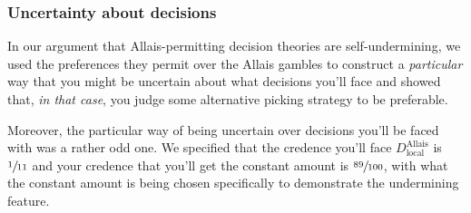 \documentclass[a4paper]{article}
\newcommand{\todoold}[2][]{\todo[backgroundcolor=white,bordercolor=orange!10,linecolor=gray!10, #1,caption={},textcolor=gray]{Pre-rev: #2}}
\newcommand{\todooldinfo}[2][]{\todoold[#1]{#2}}
\renewcommand{\color}[1]{}
\newenvironment{CCM rewritten}
{\begingroup\color{blue}} %
{\endgroup}              %
\begin{document}
%
%


\subsubsection{Uncertainty about decisions}\label{sect:reu:other mu}

In our argument that Allais-permitting decision theories are self-undermining, we used the preferences they permit over the Allais gambles to construct a \emph{particular} way that you might be uncertain about what decisions you'll face and showed that, \emph{in that case}, you judge some alternative picking strategy to be preferable. 



Moreover, the particular way of being uncertain over decisions you'll be faced with was a rather odd one. We specified that the credence you'll face $D^{\mathrm{Allais}}_{\mathrm{local}}$ is $\sfrac{1}{11}$ and your credence that you'll get the constant amount is $\sfrac{89}{100}$, with what the constant amount is being chosen specifically to demonstrate the undermining feature. 
	
\end{document}
